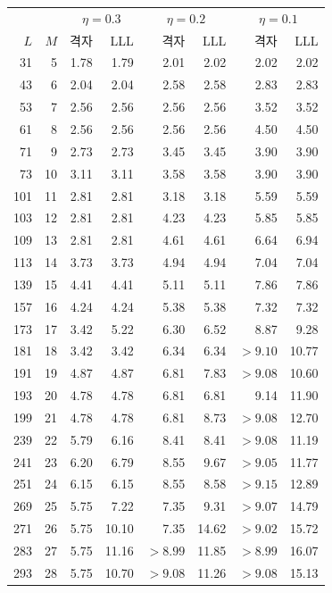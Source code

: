 \begin{table}[ht]\centering\small
\begin{tabular}{rrrrrrrr}
\toprule
& & \multicolumn{2}{c}{$\eta=0.3$} & \multicolumn{2}{c}{$\eta=0.2$} & \multicolumn{2}{c}{$\eta=0.1$}\\
$L$ & $M$ & 격자 & LLL & 격자 & LLL & 격자 & LLL\\
\midrule
31 & 5 & 1.78 & 1.79 & 2.01 & 2.02 & 2.02 & 2.02\\
43 & 6 & 2.04 & 2.04 & 2.58 & 2.58 & 2.83 & 2.83\\
53 & 7 & 2.56 & 2.56 & 2.56 & 2.56 & 3.52 & 3.52\\
61 & 8 & 2.56 & 2.56 & 2.56 & 2.56 & 4.50 & 4.50\\
71 & 9 & 2.73 & 2.73 & 3.45 & 3.45 & 3.90 & 3.90\\
73 & 10 & 3.11 & 3.11 & 3.58 & 3.58 & 3.90 & 3.90\\
101 & 11 & 2.81 & 2.81 & 3.18 & 3.18 & 5.59 & 5.59\\
103 & 12 & 2.81 & 2.81 & 4.23 & 4.23 & 5.85 & 5.85\\
109 & 13 & 2.81 & 2.81 & 4.61 & 4.61 & 6.64 & 6.94\\
113 & 14 & 3.73 & 3.73 & 4.94 & 4.94 & 7.04 & 7.04\\
139 & 15 & 4.41 & 4.41 & 5.11 & 5.11 & 7.86 & 7.86\\
157 & 16 & 4.24 & 4.24 & 5.38 & 5.38 & 7.32 & 7.32\\
173 & 17 & 3.42 & 5.22 & 6.30 & 6.52 & 8.87 & 9.28\\
181 & 18 & 3.42 & 3.42 & 6.34 & 6.34 & $>9.10$ & 10.77\\
191 & 19 & 4.87 & 4.87 & 6.81 & 7.83 & $>9.08$ & 10.60\\
193 & 20 & 4.78 & 4.78 & 6.81 & 6.81 & 9.14 & 11.90\\
199 & 21 & 4.78 & 4.78 & 6.81 & 8.73 & $>9.08$ & 12.70\\
239 & 22 & 5.79 & 6.16 & 8.41 & 8.41 & $>9.08$ & 11.19\\
241 & 23 & 6.20 & 6.79 & 8.55 & 9.67 & $>9.05$ & 11.77\\
251 & 24 & 6.15 & 6.15 & 8.55 & 8.58 & $>9.15$ & 12.89\\
269 & 25 & 5.75 & 7.22 & 7.35 & 9.31 & $>9.07$ & 14.79\\
271 & 26 & 5.75 & 10.10 & 7.35 & 14.62 & $>9.02$ & 15.72\\
283 & 27 & 5.75 & 11.16 & $>8.99$ & 11.85 & $>8.99$ & 16.07\\
293 & 28 & 5.75 & 10.70 & $>9.08$ & 11.26 & $>9.08$ & 15.13\\

\end{tabular}
\end{table}
